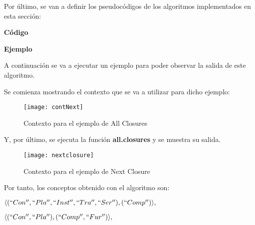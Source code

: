         \bigskip

        Por \'ultimo, se van a definir los pseudoc\'odigos de los algoritmos implementados en esta secci\'on: 

        \bigskip

        
    
        \bigskip

        
    
        \bigskip

        
    
        \clearpage


    
        \textbf{C\'odigo}

        

        \bigskip

        
    
        \bigskip
    
        \textbf{Ejemplo}

        A continuaci\'on se va a ejecutar un ejemplo para poder observar la salida de este algoritmo.

        Se comienza mostrando el contexto que se va a utilizar para dicho ejemplo:

        \begin{figure}[H]
            \centering
            \texttt{[image: contNext]}
            \caption{Contexto para el ejemplo de All Closures}
            \label{fig:contNext}
        \end{figure}

        \clearpage

        Y, por \'ultimo, se ejecuta la funci\'on \textbf{all.closures} y se muestra su salida.
        
        \begin{figure}[H]
            \centering
            \texttt{[image: nextclosure]}
            \caption{Contexto para el ejemplo de Next Closure}
            \label{fig:nextclosure}
        \end{figure}

        Por tanto, los conceptos obtenido con el algoritmo son:

        \( \langle (``Con'', ``Pla'', ``Inst'', ``Tra'', ``Ser''), (``Comp'') \rangle ,\)

        \(\langle (``Con'', ``Pla''), (``Comp'', ``Fur'') \rangle ,\)

